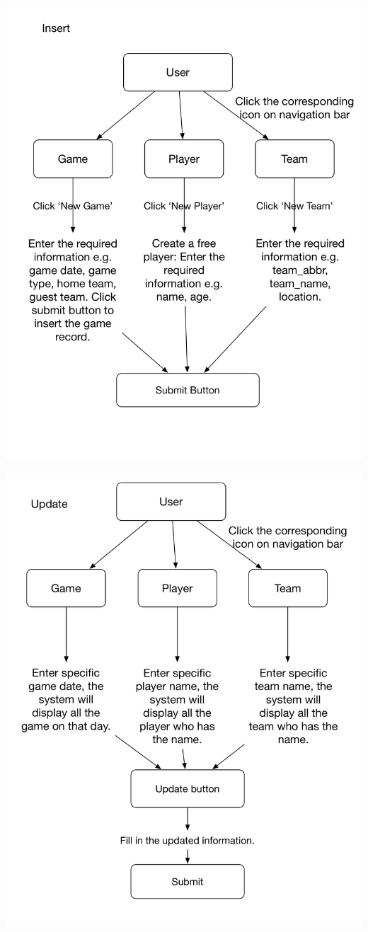 \documentclass[a4paper,12pt]{article} %
\begin{document}
\begin{center}
\includegraphics[width=1\textwidth]{InsertChart}
\end{center}
\begin{center}
\includegraphics[width=1\textwidth]{UpdateChart}
\end{center}
\end{document}
